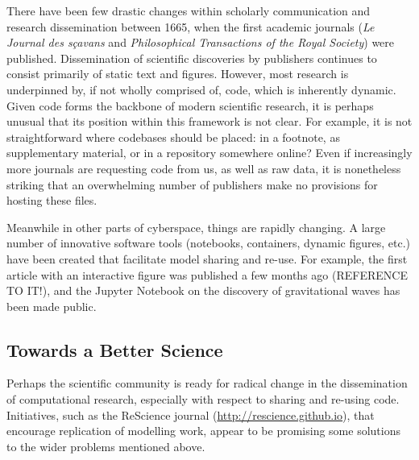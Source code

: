 \documentclass[jou]{apa6}
\begin{document}
There have been few drastic changes within scholarly communication and research dissemination between 1665, when the first academic journals (\textit{Le Journal des sçavans} and \textit{Philosophical Transactions of the Royal Society}) were published.
Dissemination of scientific discoveries by publishers continues to consist primarily of static text and figures.
However, most research is underpinned by, if not wholly comprised of, code, which is inherently dynamic.
Given code forms the backbone of modern scientific research, it is perhaps unusual that its position within this framework is not clear.
For example, it is not straightforward where codebases should be placed: in a footnote, as supplementary material, or in a repository somewhere online?
Even if increasingly more journals are requesting code from us, as well as raw data, it is nonetheless striking that an overwhelming number of publishers make no provisions for hosting these files.

Meanwhile in other parts of cyberspace, things are rapidly changing.
A large number of innovative software tools (notebooks, containers, dynamic figures, etc.) have been created that facilitate model sharing and re-use.
For example, the first article with an interactive figure was published a few months ago (REFERENCE TO IT!), and the Jupyter Notebook on the discovery of gravitational waves has been made public.

\subsection*{Towards a Better Science}

Perhaps the scientific community is ready for radical change in the dissemination of computational research, especially with respect to sharing and re-using code.
Initiatives, such as the ReScience journal ({\url{http://rescience.github.io}}), that encourage replication of modelling work, appear to be promising some solutions to the wider problems mentioned above.






\hspace*{1cm}
\end{document}
